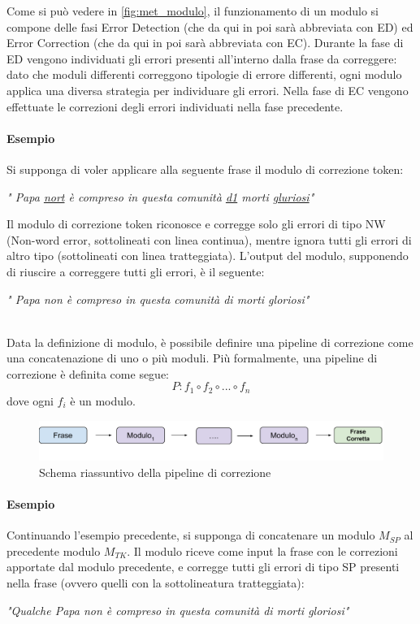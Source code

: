 Come si può vedere in \autoref{fig:met_modulo}, il funzionamento di un modulo si compone delle fasi Error Detection (che da qui in poi sarà abbreviata con ED) ed Error Correction (che da qui in poi sarà abbreviata con EC). Durante la fase di ED vengono individuati gli errori presenti all'interno dalla frase da correggere: dato che moduli differenti correggono tipologie di errore differenti, ogni modulo applica una diversa strategia per individuare gli errori. Nella fase di EC vengono effettuate le correzioni degli errori individuati nella fase precedente.

\paragraph{Esempio} Si supponga di voler applicare alla seguente frase il modulo di correzione token:
\begin{center}
\textit{" Papa \ul{nort} è compreso in questa comunità \ul{d1} morti \ul{gluriosi}"}
\end{center}
Il modulo di correzione token riconosce e corregge solo gli errori di tipo NW (Non-word error, sottolineati con linea continua), mentre ignora tutti gli errori di altro tipo (sottolineati con linea tratteggiata). L'output del modulo, supponendo di riuscire a correggere tutti gli errori, è il seguente:
\begin{center}
\textit{" Papa non è compreso in questa comunità di morti gloriosi"}
\end{center}
\ \\
Data la definizione di modulo, è possibile definire una pipeline di correzione come una concatenazione di uno o più moduli. Più formalmente, una pipeline di correzione è definita come segue:
\begin{equation}
P: f_1 \circ f_2 \circ ... \circ f_n
\end{equation}
dove ogni $f_i$ è un modulo.
\begin{figure}[H]
\centering
\includegraphics[width=\textwidth]{immagini/metodologia/generale}
\caption{Schema riassuntivo della pipeline di correzione}
\label{fig:met_generale}
\end{figure}

\paragraph{Esempio} Continuando l'esempio precedente, si supponga di concatenare un modulo $M_{SP}$ al precedente modulo $M_{TK}$. Il modulo riceve come input la frase con le correzioni apportate dal modulo precedente, e corregge tutti gli errori di tipo SP presenti nella frase (ovvero quelli con la sottolineatura tratteggiata):
\begin{center}
\textit{"Qualche Papa non è compreso in questa comunità di morti gloriosi"}
\end{center}



